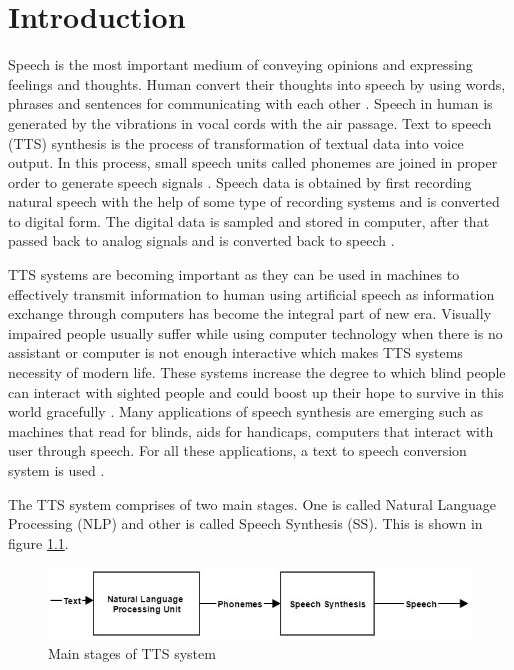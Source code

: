 \chapter{Introduction}

Speech is the most important medium of conveying opinions and expressing feelings and thoughts. Human convert their thoughts into speech by using words, phrases and sentences for communicating with each other \cite{mumtaz2016break}. Speech in human is generated by the vibrations in vocal cords with the air passage. Text to speech (TTS) synthesis is the process of transformation of textual data into voice output. In this process, small speech units called phonemes are joined in proper order to generate speech signals \cite{khilari2015review}. Speech data is obtained by first recording natural speech with the help of some type of recording systems and is converted to digital form. The digital data is sampled and stored in computer, after that passed back to analog signals and is converted back to speech \cite{greene1986perception}.

TTS systems are becoming important as they can be used in machines to effectively transmit information to human using artificial speech as information exchange through computers has become the integral part of new era. Visually impaired people usually suffer while using computer technology when there is no assistant or
computer is not enough interactive which makes TTS systems necessity of modern life. These systems increase the degree to which blind people can interact with sighted people \cite{klatt1987review} and could boost up their hope to survive in this world gracefully \cite{aida2010main}. Many applications of speech synthesis are emerging such as machines that read for blinds, aids for handicaps, computers that interact with user through speech. For all these applications, a text to speech conversion system is used \cite{klatt1982klattalk}.

The TTS system comprises of two main stages. One is called Natural Language Processing (NLP) and
other is called Speech Synthesis (SS). This is shown in figure \ref{fig:Main stages of TTS system}.

\begin{figure}
  \centering
  \includegraphics[width=\linewidth]{images/tts_bd.jpg}
  \caption{Main stages of TTS system}
  \label{fig:Main stages of TTS system}
\end{figure}

